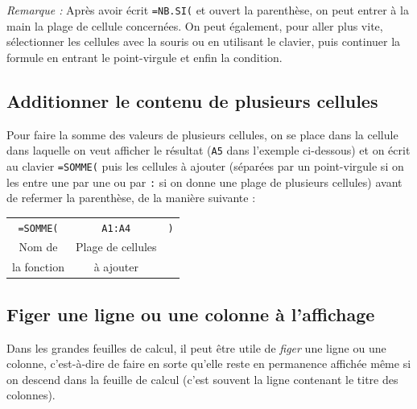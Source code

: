 

\emph{Remarque :} Après avoir écrit \texttt{=NB.SI(} et ouvert la parenthèse, on peut entrer à la main la plage de cellule concernées. On peut également, pour aller plus vite, sélectionner les cellules avec la souris ou en utilisant le clavier, puis continuer la formule en entrant le point-virgule et enfin la condition.



\subsection{Additionner le contenu de plusieurs cellules}\label{Calc3Somme}

Pour faire la somme des valeurs de plusieurs cellules, on se place dans la cellule dans laquelle on veut afficher le résultat (\texttt{A5} dans l'exemple ci-dessous) et on écrit au clavier \texttt{=SOMME(} puis les cellules à ajouter (séparées par un point-virgule si on les entre une par une ou par \texttt{:} si on donne une plage de plusieurs cellules) avant de refermer la parenthèse, de la manière suivante :

\begin{center}
	\begin{tabular}{ccc}
		\texttt{=SOMME(} & \texttt{A1:A4} &   \texttt{)} \\  
		Nom de & Plage de cellules  & \\
		la fonction & à ajouter & \\  
	\end{tabular}
\end{center}


\subsection{Figer une ligne ou une colonne à l'affichage}\label{Calc3fixer} 

Dans les grandes feuilles de calcul, il peut être utile de \emph{figer} une ligne ou une colonne, c'est-à-dire de faire en sorte qu'elle reste en permanence affichée même si on descend dans la feuille de calcul (c'est souvent la ligne contenant le titre des colonnes).

